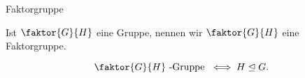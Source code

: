 \documentclass[class=article, crop=false]{standalone}
\begin{document}
\begin{zettel}{Faktorgruppe}
\begin{flashcard}[]{}
	\begin{definition}[Faktorgruppe]
		Ist $\faktor{G}{H}$ eine Gruppe, nennen wir $\faktor{G}{H}$ eine Faktorgruppe.
	\end{definition}
\end{flashcard}

\begin{theorem}
	\[
		\faktor{G}{H}\tx{-Gruppe} \iff H \trianglelefteq G
	.\]
\end{theorem}
\end{zettel}
\end{document}
